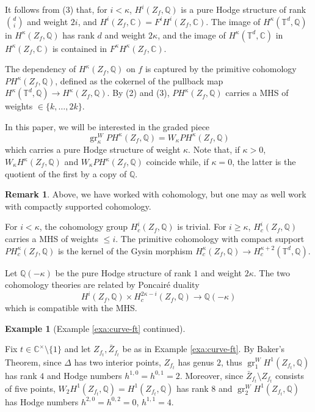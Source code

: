 \documentclass[11pt, reqno]{amsart}
\theoremstyle{plain}
\theoremstyle{definition}
\newtheorem{rem}[thm]{Remark}
\newtheorem{example}[thm]{Example}
\newcommand{\CC}{\mathbb{C}}
\newcommand{\QQ}{\mathbb{Q}}
\newcommand{\TT}{\mathbb{T}}
\DeclareMathOperator{\gr}{gr}
\begin{document}
\noindent It follows from (3) that, for $i<\kappa$,  $H^i(Z_f, \QQ)$ is a  pure Hodge structure of rank $\binom{d}{i}$ and weight $2i$, and $H^i(Z_f, \CC)=F^i H^i(Z_f,\CC)$. The image of $H^{\kappa}(\TT^d,\QQ)$ in $H^\kappa(Z_f, \QQ)$ has rank $d$ and weight $2\kappa$, and the image of $H^{\kappa}(\TT^d,\CC)$ in $H^\kappa(Z_f, \CC)$ is contained in $F^{\kappa}H^\kappa(Z_f, \CC)$. 


The dependency of $H^{\kappa}(Z_f, \QQ)$ on $f$ is captured by 
the primitive cohomology $PH^{\kappa}(Z_f, \QQ)$, defined as the cokernel of the pullback map 
$H^{\kappa}(\TT^d, \QQ) \to H^{\kappa}(Z_f, \QQ)$.
By (2) and (3),  $PH^{\kappa}(Z_f, \QQ)$ carries a MHS of weights $\in \{k,\dots,  2k\}$.

In this paper, we will be interested in the graded piece 
\begin{equation*}
\gr_\kappa^W PH^{\kappa}(Z_f, \QQ)=W_\kappa PH^{\kappa}(Z_f, \QQ)
\end{equation*}
which carries a pure Hodge structure of weight $\kappa$.
Note that, if $\kappa > 0$, $W_\kappa H^{\kappa}(Z_f, \QQ)$ and $W_\kappa PH^{\kappa}(Z_f, \QQ)$ coincide while, if $\kappa=0$, the latter is the quotient of the first by a copy of $\QQ$. 

\begin{rem}
\label{rem:compact-support}
Above, we have worked with cohomology, but one may as well work with compactly supported cohomology. 

For $i <\kappa$, the cohomology group $H^i_c(Z_f, \QQ)$ is trivial. For $i \geq \kappa$, $H^i_c(Z_f, \QQ)$ carries a MHS of weights $\leq i$. 
The primitive cohomology with compact support $PH_c^\kappa(Z_f, \QQ)$ is the kernel of the Gysin morphism $H_c^\kappa(Z_f, \QQ) \to H_c^{\kappa+2}(\TT^d, \QQ)$. 

Let $\QQ(-\kappa)$ be the pure Hodge structure of rank $1$ and weight $2\kappa$.
The two cohomology theories are related by Poncair\'{e} duality
\[ H^i(Z_f , \QQ) \times H^{2\kappa -i}_c(Z_f, \QQ) \to 
\QQ(-\kappa)
\]
which is compatible with the MHS.  
\end{rem}


\begin{example}[Example \ref{exa:curve-ft} continued]
\label{exa:curve-numbers}


Fix $t\in \CC^\times \setminus \{ 1\}$ and let $Z_{f_t}, \bar{Z}_{f_t}$ be as in Example \ref{exa:curve-ft}. By Baker's Theorem, since $\Delta$ has two interior points, $Z_{f_t}$ has genus $2$, thus $\gr_1^W H^1(Z_{f_t}, \QQ)$ has rank $4$ and Hodge numbers $h^{1,0}=h^{0,1}=2$.
Moreover, since $\bar{Z}_{f_t}\setminus Z_{f_t}$ consists of five points,  $W_2 H^1(Z_{f_t}, \QQ) = H^1(Z_{f_t}, \QQ) $ has rank $8$ and $\gr_{2}^W H^1(Z_{f_t}, \QQ)$ 
has Hodge numbers $h^{2,0}=h^{0,2}=0$, $h^{1,1} =4$.
\end{example}
\end{document}
